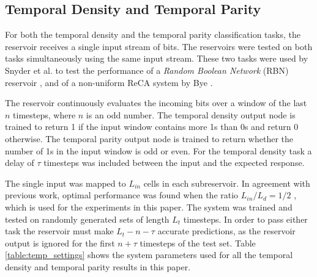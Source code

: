 \documentclass{elsarticle}
\begin{document}
\begin{multicols}{2}
	

	
	\subsection{Temporal Density and Temporal Parity}
	For both the temporal density and the temporal parity classification tasks, the 
	reservoir receives a single input stream of bits. The reservoirs were 
	tested on both tasks simultaneously using the same input stream. These two 
	tasks were used by Snyder et al. to test the performance of a 
	\textit{Random Boolean Network} (RBN) reservoir 
	\cite{snyder2013computational}, and of a non-uniform ReCA system by Bye 
	\cite{bye2016investigation}. \par The reservoir continuously evaluates the 
	incoming bits over a window of the last $n$ timesteps, where $n$ is an odd 
	number. The temporal density output node is trained to return 1 if the 
	input window contains more 1s than 0s and return 0 otherwise. The temporal 
	parity output node is trained to return whether the number of 1s in the 
	input window is odd or even. For the temporal density task a delay of 
	$\tau$ timesteps was included between the input and the expected response.  
	\par The single input was mapped to $L_{in}$ cells in each subreservoir. In 
	agreement with previous work, optimal performance was found when the ratio 
	$L_{in}/L_{d} = 1/2$ \cite{bye2016investigation}, which is used for the 
	experiments in this paper. The system was trained and tested on randomly 
	generated sets of length $L_{t}$ timesteps.  In order to pass either task 
	the reservoir must make $L_{t} - n - \tau$ accurate predictions, as the 
	reservoir output is ignored for the first $n + \tau$ timesteps of the test 
	set.  Table \ref{table:temp_settings} shows the system parameters used for 
	all the temporal density and temporal parity results in this paper. 
	

\end{multicols}
\end{document}
